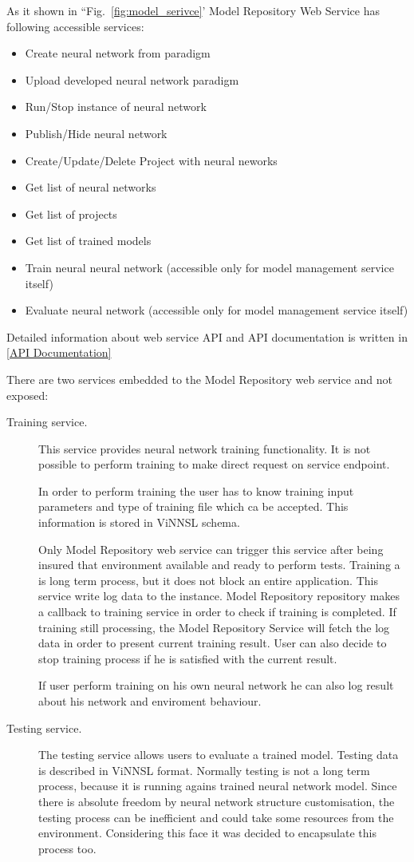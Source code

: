 As it shown in ``Fig.~\ref{fig:model_serivce}' Model Repository Web Service has following accessible services:

\begin{itemize}
\item Create neural network from paradigm
\item Upload developed neural network paradigm
\item Run/Stop instance of neural network
\item Publish/Hide neural network 
\item Create/Update/Delete Project with neural neworks
\item Get list of neural networks
\item Get list of projects
\item Get list of trained models 
\item Train neural neural network (accessible only for model management service itself)
\item Evaluate neural network (accessible only for model management service itself)
\end{itemize}

Detailed information about web service API and API documentation is written in \autoref{API Documentation}


There are two services embedded to the Model Repository web service and not exposed:

\begin{description}
\item[Training service.]  This service provides neural network training functionality. It is not possible to perform training to make direct request on service endpoint. 

In order  to perform training the user has to know training input parameters and type of training file which ca be accepted. This information is stored in ViNNSL schema. 
 
Only Model Repository web service can trigger this service after being insured that environment available and ready to perform tests. Training a is long term process, but it does not block an entire application. This service write log data to the instance. Model Repository repository makes a callback to training service in order to check if training is completed. If training still processing, the Model Repository Service will fetch the log data in order to present current training result. User can also decide to stop training process if he is satisfied with the current result.

If user perform training on his own neural network he can also log result about his network and enviroment behaviour. 
\item[Testing service.] The testing service allows users to evaluate a trained model.  Testing data is described in ViNNSL format. Normally testing is not a long term process, because it is running agains trained neural network model. Since there is absolute freedom by neural network structure customisation, the testing process can be inefficient and could take some resources from the environment. Considering this face it was decided to encapsulate this process too. 
\end{description}

